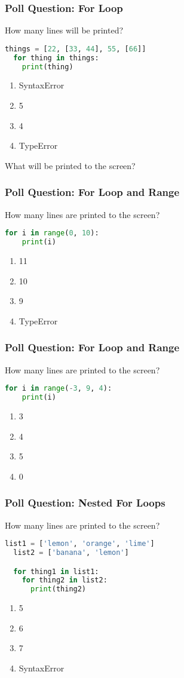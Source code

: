 \documentclass{beamer}
\begin{document}
%
%
\begin{frame}[fragile]
  \frametitle{Poll Question: For Loop}
  How many lines will be printed?
  \begin{lstlisting}[language=Python, autogobble]
  things = [22, [33, 44], 55, [66]]
  for thing in things:
    print(thing)
  \end{lstlisting}
  \vfill
  \begin{enumerate}[A]
    \item SyntaxError
    \item 5
    \item 4
    \item TypeError
  \end{enumerate}
  \pause
  What will be printed to the screen?
\end{frame}

%
%
\begin{frame}[fragile]
  \frametitle{Poll Question: For Loop and Range}
  How many lines are printed to the screen?
  \begin{lstlisting}[language=Python, autogobble]
  for i in range(0, 10):
    print(i)
  \end{lstlisting}
  \vfill
  \begin{enumerate}[A]
    \item 11
    \item 10
    \item 9
    \item TypeError
  \end{enumerate}
\end{frame}

%
%
\begin{frame}[fragile]
  \frametitle{Poll Question: For Loop and Range}
  How many lines are printed to the screen?
  \begin{lstlisting}[language=Python, autogobble]
  for i in range(-3, 9, 4):
    print(i)
  \end{lstlisting}
  \vfill
  \begin{enumerate}[A]
    \item 3
    \item 4
    \item 5
    \item 0
  \end{enumerate}
\end{frame}

%
%
\begin{frame}[fragile]
  \frametitle{Poll Question: Nested For Loops}
  How many lines are printed to the screen?
  \begin{lstlisting}[language=Python, autogobble]
  list1 = ['lemon', 'orange', 'lime']
  list2 = ['banana', 'lemon']

  for thing1 in list1:
    for thing2 in list2:
      print(thing2)
  \end{lstlisting}
  \vfill
  \begin{enumerate}[A]
    \item 5
    \item 6
    \item 7
    \item SyntaxError
  \end{enumerate}
\end{frame}
\end{document}
